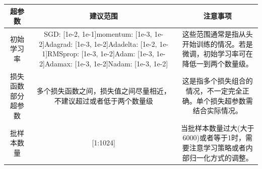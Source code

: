 \begin{longtable}[]{@{}ccc@{}}
\toprule
\begin{minipage}[b]{0.12\columnwidth}\centering\strut
超参数\strut
\end{minipage} & \begin{minipage}[b]{0.39\columnwidth}\centering\strut
建议范围\strut
\end{minipage} & \begin{minipage}[b]{0.39\columnwidth}\centering\strut
注意事项\strut
\end{minipage}\tabularnewline
\midrule
\endhead
\begin{minipage}[t]{0.12\columnwidth}\centering\strut
初始学习率\strut
\end{minipage} & \begin{minipage}[t]{0.39\columnwidth}\centering\strut
SGD: {[}1e-2, 1e-1{]}momentum: {[}1e-3, 1e-2{]}Adagrad: {[}1e-3,
1e-2{]}Adadelta: {[}1e-2, 1e-1{]}RMSprop: {[}1e-3, 1e-2{]}Adam: {[}1e-3,
1e-2{]}Adamax: {[}1e-3, 1e-2{]}Nadam: {[}1e-3, 1e-2{]}\strut
\end{minipage} & \begin{minipage}[t]{0.39\columnwidth}\centering\strut
这些范围通常是指从头开始训练的情况。若是微调，初始学习率可在降低一到两个数量级。\strut
\end{minipage}\tabularnewline
\begin{minipage}[t]{0.12\columnwidth}\centering\strut
损失函数部分超参数\strut
\end{minipage} & \begin{minipage}[t]{0.39\columnwidth}\centering\strut
多个损失函数之间，损失值之间尽量相近，不建议超过或者低于两个数量级\strut
\end{minipage} & \begin{minipage}[t]{0.39\columnwidth}\centering\strut
这是指多个损失组合的情况，不一定完全正确。单个损失超参数需结合实际情况。\strut
\end{minipage}\tabularnewline
\begin{minipage}[t]{0.12\columnwidth}\centering\strut
批样本数量\strut
\end{minipage} & \begin{minipage}[t]{0.39\columnwidth}\centering\strut
{[}1:1024{]}\strut
\end{minipage} & \begin{minipage}[t]{0.39\columnwidth}\centering\strut
当批样本数量过大(大于6000)或者等于1时，需要注意学习策略或者内部归一化方式的调整。\strut
\end{minipage}\tabularnewline

\end{longtable}
